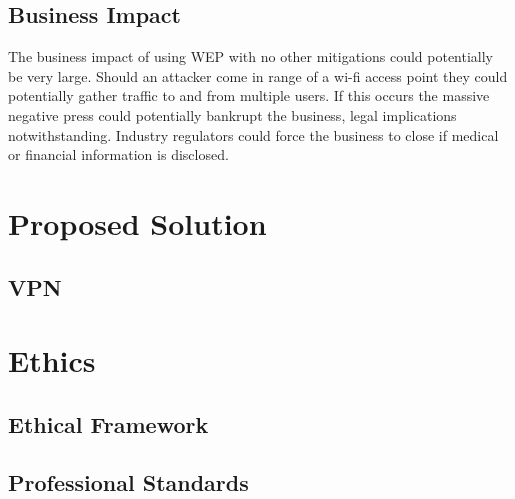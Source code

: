 \documentclass[11pt]{article}
\begin{document}
\subsection{Business Impact}
The business impact of using WEP with no other mitigations could potentially be very large. Should an attacker come in range of a wi-fi access point they could potentially gather traffic to and from multiple users. If this occurs the massive negative press could potentially bankrupt the business, legal implications notwithstanding. Industry regulators could force the business to close if medical or financial information is disclosed.

\section{Proposed Solution}
\subsection{VPN}

\section{Ethics}
\subsection{Ethical Framework}
\subsection{Professional Standards}


\end{document}
